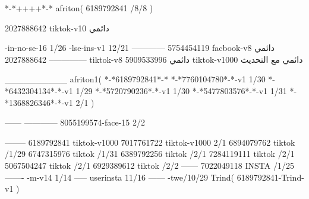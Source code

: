 *-*++++*-*
afriton(
6189792841 /8/8
)

2027888642 tiktok-v10
دائمي

-in-no-se-16 1/26
-lse-ins-v1 12/21
------------
5754454119 facbook-v8
دائمي
--------------
2027888642 tiktok-v8
دائمي
5909533996 tiktok-v1000
دائمي مع التحديث

__________
afriton1(
*-*6189792841*-*
*-*7760104780*-*-v1 1/30
*-*6432304134*-*-v1 1/29
*-*5720790236*-*-v1 1/30
*-*5477803576*-*-v1 1/31
*-*1368826346*-*-v1 2/1
)

------
------------
8055199574-face-15 2/2

--------
6189792841 tiktok-v1000
7017761722 tiktok-v1000 2/1
6894079762 tiktok /1/29
6747315976 tiktok /1/31
6389792256 tiktok /2/1
7284119111 tiktok /2/1
5067504247 tiktok /2/1
6929389612 tiktok /2/2
------
7022049118 INSTA /1/25
-------
-m-v14 1/14
-----
userinsta 11/16
------
-twe/10/29
Trind(
6189792841-Trind-v1 
)
